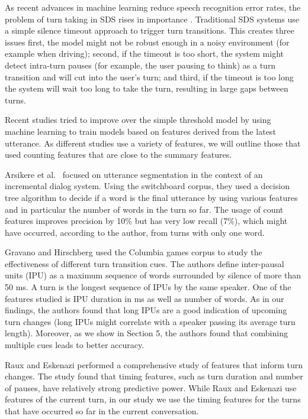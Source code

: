 
As recent advances in machine learning reduce speech recognition error rates, the problem of turn taking in SDS rises in importance \cite{hinton2012deep}. Traditional SDS systems use a simple silence timeout approach to trigger turn transitions. This creates three issues \cite{arsikere2015enhanced} first, the model might not be robust enough
in a noisy environment (for example when driving); second, if the timeout is too short, the system might
detect intra-turn pauses (for example, the user pausing to think) as a turn transition and will cut into the user's turn;
and third, if the timeout is too long the system will wait too long to take the turn, resulting in large gaps between turns.

Recent studies tried to improve over the simple threshold model by using machine learning to train models based on features derived from the latest utterance. As different studies use a variety of features, we will outline those that used counting features that are close to the summary features.

Arsikere et al.~\cite{atterer2008towards} focused on utterance segmentation in the context of an incremental dialog system.
Using the switchboard corpus, they used a decision tree algorithm to decide if a word is the final utterance by using various features and in particular the number of words in the turn so far. The usage of count features improves precision by 10\% but has very low recall (7\%), which might have occurred, according to the author, from turns with only one word.

Gravano and Hirschberg \cite{gravano2011turn} used the Columbia games corpus to study the effectiveness of
different turn transition cues. The authors define inter-pausal units (IPU) as a maximum sequence of words surrounded
by silence of more than 50 ms. A turn is the longest sequence of IPUs by the same speaker.
One of the features studied is IPU duration in ms as well as number of words. As in our findings,
the authors found that long IPUs are a good indication of upcoming turn changes (long IPUs might correlate with a speaker passing
its average turn length). Moreover, as we show in Section 5, the authors found that combining multiple cues leads to better accuracy.

Raux and Eskenazi \cite{raux2012optimizing} performed a comprehensive study of features that inform turn changes. The study
found that timing features, such as turn duration and number of pauses, have relatively strong predictive power. While Raux and Eskenazi use features of the current turn, in our study we use the timing features for the turns that have occurred so far in the current conversation.

